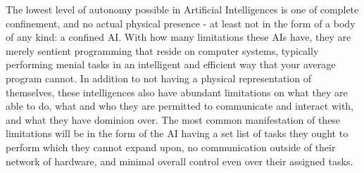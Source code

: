 The lowest level of autonomy possible in Artificial Intelligences is one of complete confinement, and no actual physical presence - at least not in the form of a body of any kind: a confined AI. With how many limitations these AIs have, they are merely sentient programming that reside on computer systems, typically performing menial tasks in an intelligent and efficient way that your average program cannot. In addition to not having a physical representation of themselves, these intelligences also have abundant limitations on what they are able to do, what and who they are permitted to communicate and interact with, and what they have dominion over. The most common manifestation of these limitations will be in the form of the AI having a set list of tasks they ought to perform which they cannot expand upon, no communication outside of their network of hardware, and minimal overall control even over their assigned tasks.